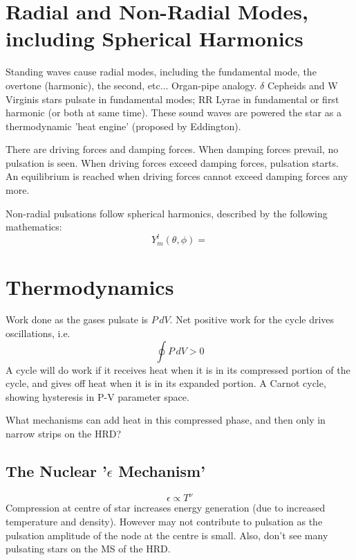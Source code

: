 \documentclass{spy}
\begin{document}
\section{Radial and Non-Radial Modes, including Spherical Harmonics}
Standing waves cause radial modes, including the fundamental mode, the overtone (harmonic), the second, etc... Organ-pipe analogy. 
\(\delta\) Cepheids and W Virginis stars pulsate in fundamental modes; RR Lyrae in fundamental or first harmonic (or both at same time).  
These sound waves are powered the star as a thermodynamic 'heat engine' (proposed by Eddington). 

There are driving forces and damping forces. When damping forces prevail, no pulsation is seen. When driving forces exceed damping forces, pulsation starts. An equilibrium is reached when driving forces cannot exceed damping forces any more. 

Non-radial pulsations follow spherical harmonics, described by the following mathematics:
\begin{equation}
    Y^l_m (\theta, \phi) = 
\end{equation}

\section{Thermodynamics}
Work done as the gases pulsate is \(P \,dV\). 
Net positive work for the cycle drives oscillations, i.e.
\begin{equation}
    \oint P \,dV > 0
\end{equation}
A cycle will do work if it receives heat when it is in its compressed portion of the cycle, and gives off heat when it is in its expanded portion.
A Carnot cycle, showing hysteresis in P-V parameter space.

What mechanisms can add heat in this compressed phase, and then only in narrow strips on the HRD?

\subsection{The Nuclear '\(\epsilon\) Mechanism'}
\begin{equation}
\epsilon \propto T^\nu
\end{equation}
Compression at centre of star increases energy generation (due to increased temperature and density). However may not contribute to pulsation as the pulsation amplitude of the node at the centre is small. Also, don't see many pulsating stars on the MS of the HRD.
\end{document}
